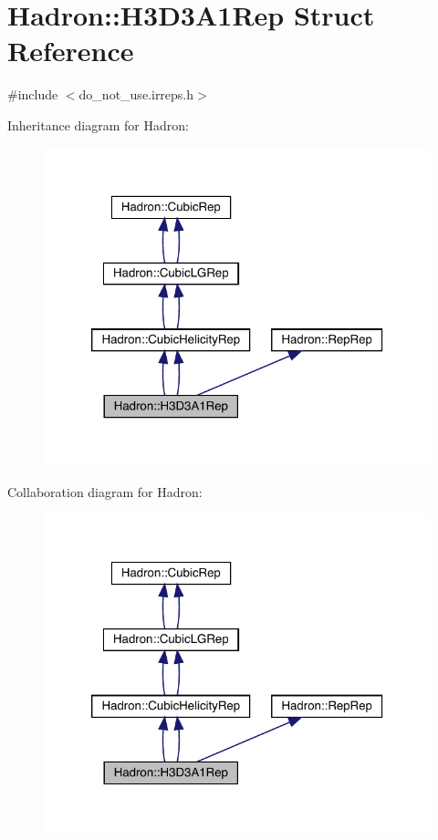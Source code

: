 \hypertarget{structHadron_1_1H3D3A1Rep}{}\section{Hadron\+:\+:H3\+D3\+A1\+Rep Struct Reference}
\label{structHadron_1_1H3D3A1Rep}


{\ttfamily \#include $<$do\+\_\+not\+\_\+use.\+irreps.\+h$>$}



Inheritance diagram for Hadron\+:\nopagebreak
\begin{figure}[H]
\begin{center}
\leavevmode
\includegraphics[width=320pt]{d1/d64/structHadron_1_1H3D3A1Rep__inherit__graph}
\end{center}
\end{figure}


Collaboration diagram for Hadron\+:\nopagebreak
\begin{figure}[H]
\begin{center}
\leavevmode
\includegraphics[width=320pt]{dc/d8c/structHadron_1_1H3D3A1Rep__coll__graph}
\end{center}
\end{figure}
